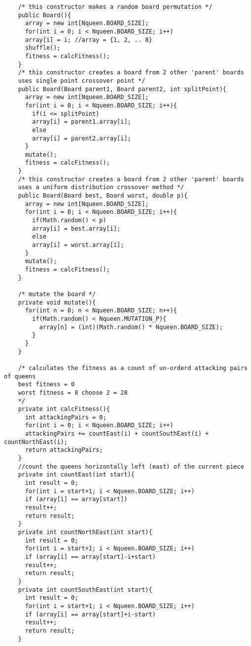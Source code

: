 \documentclass[a4paper,11pt]{article}
\begin{document}
\begin{lstlisting}
    /* this constructor makes a random board permutation */
    public Board(){
      array = new int[Nqueen.BOARD_SIZE];
      for(int i = 0; i < Nqueen.BOARD_SIZE; i++)
      array[i] = i; //array = {1, 2, .. 8}
      shuffle();
      fitness = calcFitness();
    }
    /* this constructor creates a board from 2 other 'parent' boards
    uses single point crossover point */
    public Board(Board parent1, Board parent2, int splitPoint){    
      array = new int[Nqueen.BOARD_SIZE];
      for(int i = 0; i < Nqueen.BOARD_SIZE; i++){
        if(i <= splitPoint)
        array[i] = parent1.array[i];
        else
        array[i] = parent2.array[i];
      }
      mutate();
      fitness = calcFitness();
    }
    /* this constructor creates a board from 2 other 'parent' boards
    uses a uniform distribution crossover method */
    public Board(Board best, Board worst, double p){
      array = new int[Nqueen.BOARD_SIZE];      
      for(int i = 0; i < Nqueen.BOARD_SIZE; i++){
        if(Math.random() < p)
        array[i] = best.array[i];
        else
        array[i] = worst.array[i];
      }
      mutate();
      fitness = calcFitness();
    }                  

    /* mutate the board */
    private void mutate(){
      for(int n = 0; n < Nqueen.BOARD_SIZE; n++){
        if(Math.random() < Nqueen.MUTATION_P){
          array[n] = (int)(Math.random() * Nqueen.BOARD_SIZE);
        }
      }
    }
    
    /* calculates the fitness as a count of un-orderd attacking pairs of queens
    best fitness = 0
    worst fitness = 8 choose 2 = 28
    */
    private int calcFitness(){
      int attackingPairs = 0;
      for(int i = 0; i < Nqueen.BOARD_SIZE; i++)
      attackingPairs += countEast(i) + countSouthEast(i) + countNorthEast(i);
      return attackingPairs;
    }
    //count the queens horizontally left (east) of the current piece
    private int countEast(int start){
      int result = 0;
      for(int i = start+1; i < Nqueen.BOARD_SIZE; i++)
      if (array[i] == array[start])
      result++;                        
      return result;
    }
    private int countNorthEast(int start){
      int result = 0;
      for(int i = start+1; i < Nqueen.BOARD_SIZE; i++)
      if (array[i] == array[start]-i+start)
      result++;
      return result;
    }
    private int countSouthEast(int start){
      int result = 0;
      for(int i = start+1; i < Nqueen.BOARD_SIZE; i++)
      if (array[i] == array[start]+i-start)
      result++;
      return result;
    }


\end{lstlisting}
\end{document}
